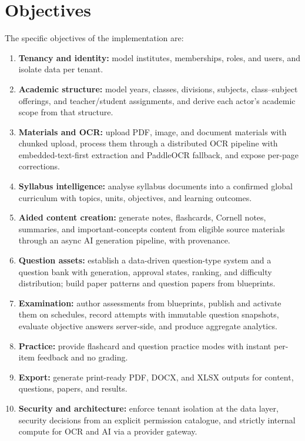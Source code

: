 \section{Objectives}

\noindent The specific objectives of the implementation are:

\begin{enumerate}
  \item \textbf{Tenancy and identity:} model institutes, memberships, roles, and
  users, and isolate data per tenant.
  \item \textbf{Academic structure:} model years, classes, divisions, subjects,
  class--subject offerings, and teacher/student assignments, and derive each
  actor's academic scope from that structure.
  \item \textbf{Materials and OCR:} upload PDF, image, and document materials
  with chunked upload, process them through a distributed OCR pipeline with
  embedded-text-first extraction and PaddleOCR fallback, and expose per-page
  corrections.
  \item \textbf{Syllabus intelligence:} analyse syllabus documents into a
  confirmed global curriculum with topics, units, objectives, and learning
  outcomes.
  \item \textbf{Aided content creation:} generate notes, flashcards, Cornell
  notes, summaries, and important-concepts content from eligible source
  materials through an async AI generation pipeline, with provenance.
  \item \textbf{Question assets:} establish a data-driven question-type system
  and a question bank with generation, approval states, ranking, and difficulty
  distribution; build paper patterns and question papers from blueprints.
  \item \textbf{Examination:} author assessments from blueprints, publish and
  activate them on schedules, record attempts with immutable question
  snapshots, evaluate objective answers server-side, and produce aggregate
  analytics.
  \item \textbf{Practice:} provide flashcard and question practice modes with
  instant per-item feedback and no grading.
  \item \textbf{Export:} generate print-ready PDF, DOCX, and XLSX outputs for
  content, questions, papers, and results.
  \item \textbf{Security and architecture:} enforce tenant isolation at the
  data layer, security decisions from an explicit permission catalogue, and
  strictly internal compute for OCR and AI via a provider gateway.
\end{enumerate}

